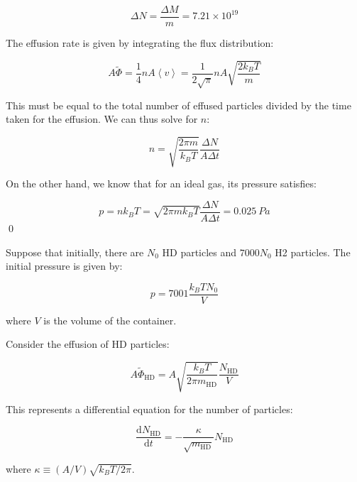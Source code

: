 \documentclass[12pt]{article}
\begin{document}
\begin{equation}
    \Delta N = \frac{\Delta M}{m} = 7.21 \times 10^{19}
\end{equation}

The effusion rate is given by integrating the flux distribution:

\begin{equation}
    A\tilde{\Phi} = \frac{1}{4} nA \left\langle v \right\rangle = \frac{1}{2\sqrt{\pi}} nA \sqrt{\frac{2k_{B}T}{m}}
\end{equation}

This must be equal to the total number of effused particles divided by the time taken for the effusion. We can thus solve for $n$:

\begin{equation}
    n = \sqrt{\frac{2\pi m}{k_{B}T}} \frac{\Delta N}{A \Delta t}
\end{equation}

On the other hand, we know that for an ideal gas, its pressure satisfies:

\begin{equation}
    p = nk_{B}T = \sqrt{2\pi m k_{B} T} \frac{\Delta N}{A \Delta t} = \qty{0.025}{Pa}
\end{equation}
\qed



Suppose that initially, there are $N_{0}$ HD particles and $7000N_{0}$ H2 particles. The initial pressure is given by:

\begin{equation}
    p = 7001 \frac{k_{B}TN_{0}}{V}
\end{equation}

where $V$ is the volume of the container.

Consider the effusion of HD particles:

\begin{equation}
    A\tilde{\Phi}_{\text{HD}} = A\sqrt{\frac{k_{B}T}{2\pi m_{\text{HD}}}} \frac{N_{\text{HD}}}{V}
\end{equation}

This represents a differential equation for the number of particles:

\begin{equation}
    \frac{\mathrm{d}N_{\text{HD}}}{\mathrm{d}t} = -\frac{\kappa}{\sqrt{m_{\text{HD}}}} N_{\text{HD}}
\end{equation}

where $\kappa \equiv (A/V) \sqrt{k_{B}T/2\pi}$.
\end{document}
